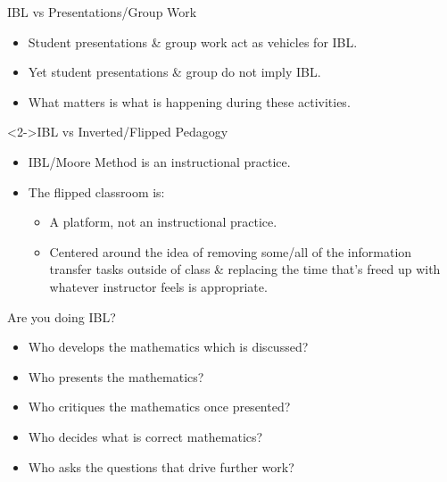 \documentclass[10pt]{beamer}
\begin{document}

\begin{frame}

\begin{block}{IBL vs Presentations/Group Work}
\begin{itemize}
\item Student presentations \& group work act as vehicles for IBL. 
\item Yet student presentations \& group do not imply IBL. 
\item What matters is what is happening during these activities.
\end{itemize}
\end{block}

\begin{block}<2->{IBL vs Inverted/Flipped Pedagogy}
\begin{itemize}
\item<2-> IBL/Moore Method is an instructional practice.
\item<2-> The flipped classroom is:
    \begin{itemize}\normalsize
    \item<2-> A platform, not an instructional practice. 
    \item<2-> Centered around the idea of removing some/all of the information transfer tasks outside of class \& replacing the time that's freed up with whatever instructor feels is appropriate.
    \end{itemize}
\end{itemize}
\end{block}

\end{frame}


\begin{frame}

\begin{block}{Are you doing IBL?}
\begin{itemize}
\item<2-> Who develops the mathematics which is discussed?
\item<3-> Who presents the mathematics?
\item<4-> Who critiques the mathematics once presented?
\item<5-> Who decides what is correct mathematics?
\item<6-> Who asks the questions that drive further work?
\end{itemize}
\end{block}

\end{frame}

\end{document}
